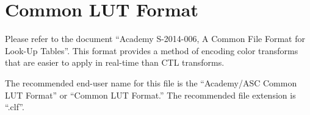 \numberedformat
\chapter{Common LUT Format}

Please refer to the document ``Academy S-2014-006, A Common File Format for Look-Up Tables''. This format provides a method of encoding color transforms that are easier to apply in real-time than CTL transforms.

The recommended end-user name for this file is the ``Academy/ASC Common LUT Format'' or ``Common LUT Format.'' The recommended file extension is ``.clf''.